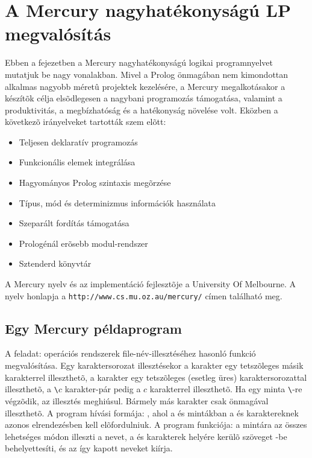 \clearpage

\section{A Mercury nagyhatékonyságú LP megvalósítás}

Ebben a fejezetben a Mercury nagyhatékonyságú logikai programnyelvet mutatjuk be nagy
vonalakban. Mivel a Prolog önmagában nem kimondottan alkalmas nagyobb méretû projektek
kezelésére, a Mercury megalkotásakor a készítõk célja elsõdlegesen a nagybani programozás
támogatása, valamint a produktivitás, a megbízhatóság és a hatékonyság növelése volt.
Eközben a következõ irányelveket tartották szem elõtt:

\begin{itemize}
\item Teljesen deklaratív programozás
\item Funkcionális elemek integrálása
\item Hagyományos Prolog szintaxis megõrzése
\item Típus, mód és determinizmus információk használata
\item Szeparált fordítás támogatása
\item Prologénál erõsebb modul-rendszer
\item Sztenderd könyvtár
\end{itemize}

A Mercury nyelv és az implementáció fejlesztõje a University Of Melbourne. A nyelv
honlapja a \verb'http://www.cs.mu.oz.au/mercury/' címen található meg.

\subsection{Egy Mercury példaprogram}

A feladat: operációs rendszerek file-név-illesztéséhez hasonló
funkció megvalósítása. Egy karaktersorozat illesztésekor a  karakter
egy tetszõleges másik karakterrel illeszthetõ, a \cd{*} karakter egy tetszõleges
(esetleg üres) karaktersorozattal illeszthetõ, a \verb+\+$c$ karakter-pár pedig
a $c$ karakterrel illeszthetõ. Ha egy minta \verb+\+-re végzõdik, az illesztés
meghiúsul. Bármely más karakter csak önmagával illeszthetõ.
\br
A program hívási formája: , ahol a 
és  mintákban a \cd{*} és  karaktereknek azonos elrendezésben
kell elõfordulniuk.
\br
A program funkciója: a  mintára az összes lehetséges módon illeszti
a  nevet, a \cd{*} és  karakterek helyére kerülõ szöveget -be
behelyettesíti, és az így kapott neveket kiírja.

